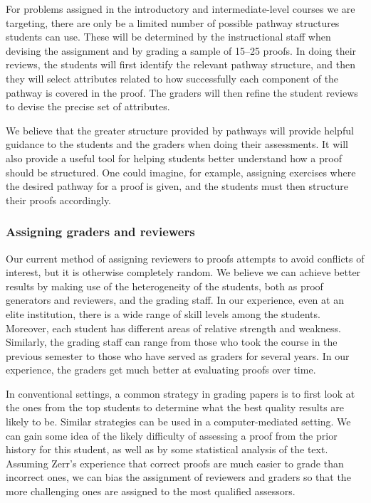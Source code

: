 \documentclass[12pt]{article}
\begin{document}
For problems assigned in the introductory and intermediate-level
courses we are targeting, there are only be a limited number of
possible pathway structures students can use.  These will be
determined by the instructional staff when devising the assignment and
by grading a sample of 15--25 proofs.  In doing their reviews, the
students will first identify the relevant pathway structure, and then
they will select attributes related to how successfully each component
of the pathway is covered in the proof.  The graders will then refine
the student reviews to devise the precise set of attributes.

We believe that the greater structure provided by pathways will
provide helpful guidance to the students and the graders when doing
their assessments.  It will also provide a useful tool for helping
students better understand how a proof should be structured.  One
could imagine, for example, assigning exercises where the
desired pathway for a proof is given, and the students must
then structure their proofs accordingly.

\subsubsection*{Assigning graders and reviewers}

Our current method of assigning reviewers to proofs attempts to avoid
conflicts of interest, but it is otherwise completely random.  We
believe we can achieve better results by making use of the
heterogeneity of the students, both as proof generators and reviewers,
and the grading staff.  In our experience, even at an elite
institution, there is a wide range of skill levels among the students.
Moreover, each student has different areas of relative strength and
weakness.  Similarly, the grading staff can range from those who took
the course in the previous semester to those who have served as
graders for several years.  In our experience, the graders get much
better at evaluating proofs over time.

In conventional settings, a common strategy in grading papers is to
first look at the ones from the top students to determine what the
best quality results are likely to be.  Similar strategies can be used
in a computer-mediated setting.  We can gain some idea of the likely
difficulty of assessing a proof from the prior history for this
student, as well as by some statistical analysis of the text.
Assuming Zerr's experience that correct proofs are much easier to
grade than incorrect ones, we can bias the assignment of reviewers and
graders so that the more challenging ones are assigned to the most
qualified assessors.
\end{document}
